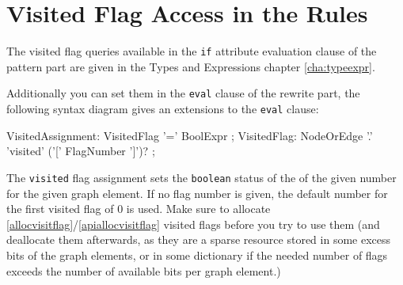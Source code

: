 \section{Visited Flag Access in the Rules} \label{sub:visitedaccess}

The visited flag queries available in the \texttt{if} attribute evaluation clause of the pattern part are given in the Types and Expressions chapter \ref{cha:typeexpr}.

Additionally you can set them in the \texttt{eval} clause of the rewrite part, the following syntax diagram gives an extensions to the \texttt{eval} clause:

\begin{rail}
  VisitedAssignment:
    VisitedFlag '=' BoolExpr
	;
	VisitedFlag:
    NodeOrEdge '.' 'visited' ('[' FlagNumber ']')?
  ;
\end{rail}

The \texttt{visited} flag assignment sets the \texttt{boolean} status of the  of the given number for the given graph element.
If no flag number is given, the default number for the first visited flag of 0 is used.
Make sure to allocate \ref{allocvisitflag}/\ref{apiallocvisitflag} visited flags before you try to use them
(and deallocate them afterwards, as they are a sparse resource stored in some excess bits of the graph elements, or in some dictionary if the needed number of flags exceeds the number of available bits per graph element.)


